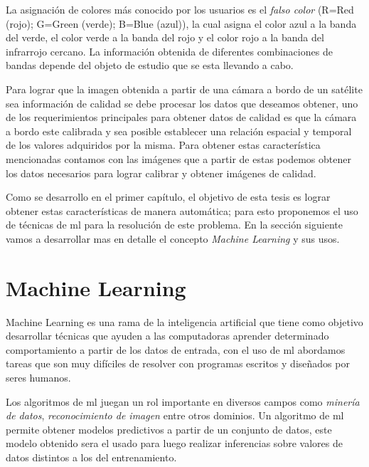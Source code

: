 La asignación de colores más conocido por los usuarios es el \textit{falso color} (R=Red (rojo); G=Green (verde); B=Blue (azul)), la cual asigna el color azul a la banda del verde, el color verde a la banda del rojo y el color rojo a la banda del infrarrojo cercano. La información obtenida de diferentes combinaciones de bandas depende del objeto de estudio que se esta llevando a cabo.


Para lograr que la imagen obtenida a partir de una cámara a bordo de un satélite sea información de calidad se debe procesar los datos que deseamos obtener, uno de los requerimientos principales para obtener datos de calidad es que la cámara a bordo este calibrada y sea posible establecer una relación espacial y temporal de los valores adquiridos por la misma. Para obtener estas característica mencionadas contamos con las imágenes que a partir de estas podemos obtener los datos necesarios para lograr calibrar y obtener imágenes de calidad. 

Como se desarrollo en el primer capítulo, el objetivo de esta tesis es lograr obtener estas características de manera automática; para esto proponemos el uso de técnicas de \ac{ml} para la resolución de este problema. En la sección siguiente vamos a desarrollar mas en detalle  el concepto \textit{Machine Learning} y sus usos.




\section{Machine Learning}\label{sec:machinelaerning}

Machine Learning es una rama de la inteligencia artificial que tiene como objetivo desarrollar técnicas que ayuden a las computadoras aprender determinado comportamiento a partir de los datos de entrada, con el uso de \ac{ml} abordamos tareas que son muy difíciles de resolver con programas escritos y diseñados por seres humanos.

Los algoritmos de \ac{ml} juegan un rol importante en diversos campos como \textit{minería de datos}, \textit{reconocimiento de imagen} entre otros dominios. Un algoritmo de  \ac{ml} permite obtener modelos predictivos a partir de un conjunto de datos, este modelo obtenido sera el usado para luego realizar inferencias sobre valores de datos distintos a los del entrenamiento.

